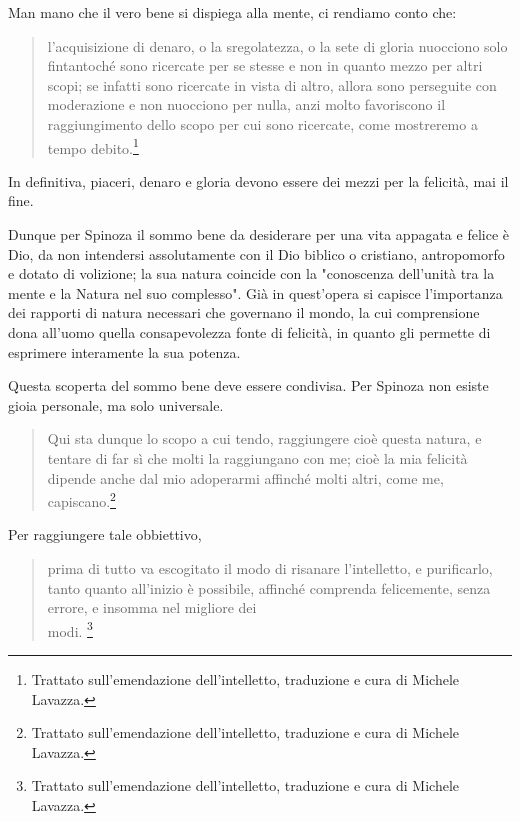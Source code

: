 Man mano che il vero bene si dispiega alla mente, ci rendiamo conto che:

\begin{quotation}
	\small l'acquisizione di denaro, o la sregolatezza, o la sete di gloria nuocciono solo
	fintantoché sono ricercate per se stesse e non in quanto mezzo per altri scopi; se infatti sono
	ricercate in vista di altro, allora sono perseguite con moderazione e non nuocciono per nulla, anzi
	molto favoriscono il raggiungimento dello scopo per cui sono ricercate, come mostreremo a tempo
	debito.\footnote{Trattato sull'emendazione dell'intelletto, traduzione e cura di Michele Lavazza.}
\end{quotation}

In definitiva, piaceri, denaro e gloria devono essere dei mezzi per la felicità, mai il fine.

Dunque per Spinoza il sommo bene da desiderare per una vita appagata e felice è Dio, da non intendersi assolutamente con il Dio biblico o cristiano, antropomorfo e dotato di volizione; la sua natura coincide con la "conoscenza dell'unità tra la mente e la Natura nel suo complesso". Già in quest'opera si capisce l'importanza dei rapporti di natura necessari che governano il mondo, la cui comprensione dona all'uomo quella consapevolezza fonte di felicità, in quanto gli permette di esprimere interamente la sua potenza.

Questa scoperta del sommo bene deve essere condivisa. Per Spinoza non esiste gioia personale, ma solo universale.

\begin{quotation}
	\small Qui sta dunque lo scopo a cui tendo, raggiungere cioè
	questa natura, e tentare di far sì che molti la raggiungano con me; cioè la mia felicità dipende anche
	dal mio adoperarmi affinché molti altri, come me, capiscano.\footnote{Trattato sull'emendazione dell'intelletto, traduzione e cura di Michele Lavazza.}
\end{quotation}

Per raggiungere tale obbiettivo,

\begin{quotation}
	\small  prima di tutto va escogitato il modo di
	risanare l'intelletto, e purificarlo, tanto quanto all'inizio è possibile, affinché comprenda felicemente,
	senza errore, e insomma nel migliore dei \\modi. \footnote{Trattato sull'emendazione dell'intelletto, traduzione e cura di Michele Lavazza.}
\end{quotation}


